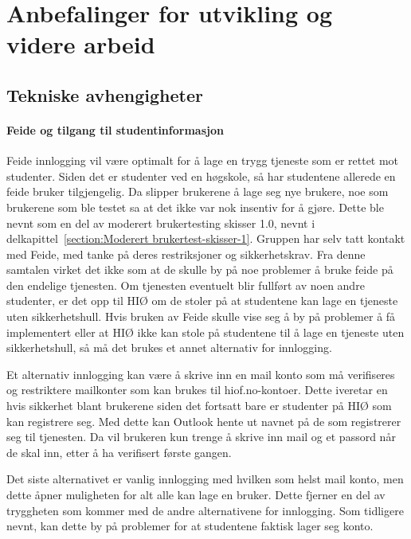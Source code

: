 \section{Anbefalinger for utvikling og videre arbeid}
\label{section:anbefaling-videre-utvikling}

\subsection{Tekniske avhengigheter}

\paragraph{Feide og tilgang til studentinformasjon}
Feide innlogging vil være optimalt for å lage en trygg tjeneste som er rettet mot studenter. Siden det er studenter ved en høgskole, så har studentene allerede en feide bruker tilgjengelig. Da slipper brukerene å lage seg nye brukere, noe som brukerene som ble testet sa at det ikke var nok insentiv for å gjøre. Dette ble nevnt som en del av moderert brukertesting skisser 1.0, nevnt i delkapittel~\ref{section:Moderert brukertest-skisser-1}.
Gruppen har selv tatt kontakt med Feide, med tanke på deres restriksjoner og sikkerhetskrav. Fra denne samtalen virket det ikke som at de skulle by på noe problemer å bruke feide på den endelige tjenesten. Om tjenesten eventuelt blir fullført av noen andre studenter, er det opp til HIØ om de stoler på at studentene kan lage en tjeneste uten sikkerhetshull. \cite{FEIDE-EPOST:24}
Hvis bruken av Feide skulle vise seg å by på problemer å få implementert eller at HIØ ikke kan stole på studentene til å lage en tjeneste uten sikkerhetshull, så må det brukes et annet alternativ for innlogging. 

Et alternativ innlogging kan være å skrive inn en mail konto som må verifiseres og restriktere mailkonter som kan brukes til hiof.no-kontoer. Dette iveretar en hvis sikkerhet blant brukerene siden det fortsatt bare er studenter på HIØ som kan registrere seg. Med dette kan Outlook hente ut navnet på de som registrerer seg til tjenesten. Da vil brukeren kun trenge å skrive inn mail og et passord når de skal inn, etter å ha verifisert første gangen. 

Det siste alternativet er vanlig innlogging med hvilken som helst mail konto, men dette åpner muligheten for alt alle kan lage en bruker. Dette fjerner en del av tryggheten som kommer med de andre alternativene for innlogging. Som tidligere nevnt, kan dette by på problemer for at studentene faktisk lager seg konto.


